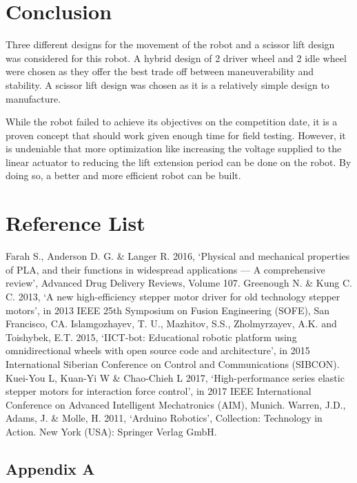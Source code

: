\documentclass[12pt]{report}
\begin{document}
\pagebreak

\chapter{Conclusion}
Three different designs for the movement of the robot and a scissor lift design was considered for this robot. A hybrid design of 2 driver wheel and 2 idle wheel were chosen as they offer the best trade off between maneuverability and stability. A scissor lift design was chosen as it is a relatively simple design to manufacture.

While the robot failed to achieve its objectives on the competition date, it is a proven concept that should work given enough time for field testing. However, it is undeniable that more optimization like increasing the voltage supplied to the linear actuator to reducing the lift extension period can be done on the robot. By doing so, a better and more efficient robot can be built.
\pagebreak



\chapter{Reference List}
\begin{flushleft}
Farah S., Anderson D. G. \& Langer R. 2016, ‘Physical and mechanical properties of PLA, and their functions in widespread applications — A comprehensive review’, Advanced Drug Delivery Reviews, Volume 107.
\linebreak
\linebreak
Greenough N. \& Kung C. C. 2013, ‘A new high-efficiency stepper motor driver for old technology stepper motors’, in 2013 IEEE 25th Symposium on Fusion Engineering (SOFE), San Francisco, CA.
\linebreak
\linebreak
Islamgozhayev, T. U., Mazhitov, S.S., Zholmyrzayev, A.K. and Toishybek, E.T. 2015, ‘IICT-bot: Educational robotic platform using omnidirectional wheels with open source code and architecture’, in 2015 International Siberian Conference on Control and Communications (SIBCON).
\linebreak
\linebreak
Kuei-You L, Kuan-Yi W \& Chao-Chieh L 2017, ‘High-performance series elastic stepper motors for interaction force control’, in 2017 IEEE International Conference on Advanced Intelligent Mechatronics (AIM), Munich.
\linebreak
\linebreak
Warren, J.D., Adams, J. \& Molle, H. 2011, ‘Arduino Robotics’, Collection: Technology in Action. New York (USA): Springer Verlag GmbH.
\end{flushleft}
\pagebreak


\section*{Appendix A}
\end{document}
